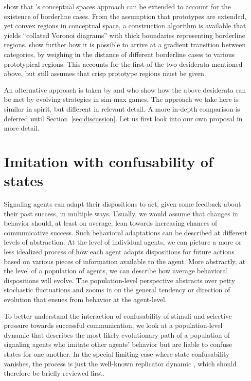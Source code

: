 \documentclass[fleqn,reqno,10pt]{article}
\begin{document}
\citet{DouvenDecock2011:Vagueness:-A-Co} show that
\citeauthor{Gardenfors2000:Conceptual-Spac}'s conceptual spaces
approach can be extended to account for the existence of borderline
cases. From the assumption that prototypes are extended, yet convex
regions in conceptual space, a construction algorithm is available
that yields ``collated Voronoi diagrams'' with thick boundaries
representing borderline
regions. \citet{DecockDouven2012:What-is-Graded-} show further how it
is possible to arrive at a gradient transition between categories, by
weighing in the distance of different borderline cases to various
prototypical regions. This accounts for the first of the two
desiderata mentioned above, but still assumes that crisp prototype
regions must be given.

An alternative approach is taken by \citet{FrankeJager2010:Vagueness-Signa} and
\citet{OConnor2013:The-Evolution-o} who show how the above desiderata can be met by evolving
strategies in sim-max games. The approach we take here is similar in spirit, but different in
relevant detail. A more in-depth comparison is deferred until Section~\ref{sec:discussion}. Let
us first look into our own proposal in more detail.



\section{Imitation with confusability of states}
\label{sec:repl-diff-dynam}

Signaling agents can adapt their dispositions to act, given some feedback about their past
success, in multiple ways. Usually, we would assume that changes in behavior should, at least
on average, lean towards increasing chances of communicative success. Such behavioral
adaptations can be described at different levels of abstraction. At the level of individual
agents, we can picture a more or less idealized process of how each agent adapts dispositions
for future actions based on various pieces of information available to the agent. More
abstractly, at the level of a population of agents, we can describe how average behavioral
dispositions will evolve. The population-level perspective abstracts over petty stochastic
fluctuations and zooms in on the general tendency or direction of evolution that ensues from
behavior at the agent-level.

To better understand the interaction of confusability of stimuli and selective pressure towards
successful communication, we look at a population-level dynamic that describes the most likely
evolutionary path of a population of signaling agents who imitate other agents' behavior but
are liable to confuse states for one another. In the special limiting case where state
confusability vanishes, the process is just the well-known replicator dynamic
\citep{TaylorJonker1978:Evolutionary-St}, which should therefore be briefly reviewed first.
\end{document}
